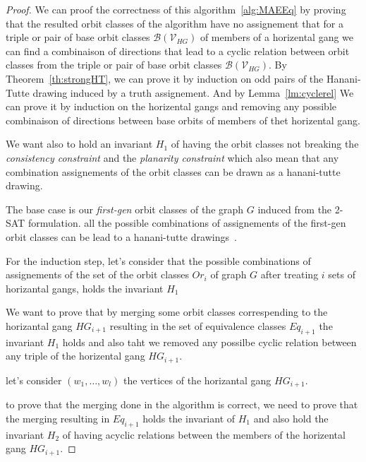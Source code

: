 \begin{proof}
    We can proof the correctness of this algorithm~\ref{alg:MAEEq} by proving that the resulted orbit classes of 
    the algorithm have no assignement that for a triple or pair of base orbit classes $\mathcal{B}\left( \mathcal{V}_{HG} \right) $ of members of a 
    horizental gang we can find a combinaison of directions that lead to a cyclic relation between orbit classes 
    from the triple or pair of base orbit classes $\mathcal{B}\left( \mathcal{V}_{HG} \right) $. By Theorem~\ref{th:strongHT}, we 
    can prove it by induction on odd pairs of the Hanani-Tutte drawing induced by a truth assignement. And by Lemma~\ref{lm:cyclerel} 
    We can prove it by induction on the horizental gangs and removing any possible combinaison of directions between base 
    orbits of members of thet horizental gang.
    
    We want also to hold an invariant $H_1$ of having the orbit classes not breaking the \textit{consistency constraint} 
    and the \textit{planarity constraint} which also mean that any combination assignements of the orbit classes can be drawn 
    as a hanani-tutte drawing. 


    The base case is our \textit{first-gen} orbit classes of the graph $G$ induced from the 2-SAT formulation.
    all the possible combinations of assignements of the first-gen orbit classes can be lead to 
    a hanani-tutte drawings~\cite{bruckner2022level}. 

For the induction step, let's consider that the possible combinations of assignements of 
the set of the orbit classes $Or_i$ of graph $G$ after treating $i$ sets of horizantal gangs, 
holds the invariant $H_1$

We want to prove that by merging some 
orbit classes correspending to the horizantal gang $HG_{i+1}$ resulting in the set of equivalence classes $Eq_{i+1}$ the invariant $H_1$ holds
and also taht we removed any possilbe cyclic relation between any triple of the horizental gang
$HG_{i+1}$.

let's consider $\left( w_1, \ldots, w_l \right)$ the vertices of the horizantal gang $HG_{i+1}$. 

to prove that the merging done in the algorithm is correct, we need to prove that the merging resulting in $Eq_{i+1}$ 
holds the invariant of $H_1$ and also hold the invariant $H_2$ of having acyclic relations between 
the members of the horizental gang $HG_{i+1}$. 


\end{proof}
